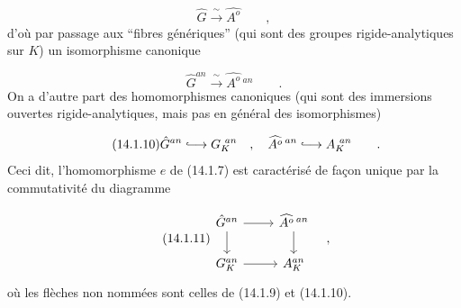 \begin{equation}\tag{14.1.8}
\hat{G} \xrightarrow{\ \sim\ } \widehat{A^{o}} \qquad ,
\end{equation}
d'où par passage aux ``fibres génériques'' (qui sont des groupes rigide-analytiques sur $K$) un isomorphisme canonique

\begin{equation}\tag{14.1.9}
\hat{G}^{an} \xrightarrow{\ \sim\ } \widehat{A^{o}}\,{}^{an} \qquad .
\end{equation}
On a d'autre part des homomorphismes canoniques (qui sont des immersions ouvertes rigide-analytiques, mais pas en général des isomorphismes)

\begin{equation}\tag{14.1.10}
\hat{G}^{an} \lhook\joinrel\longrightarrow G_K^{\ an} \quad , \quad \widehat{A^{o}}\,{}^{an} \lhook\joinrel\longrightarrow A_K^{\ an} \qquad .
\end{equation}
Ceci dit, l'homomorphisme $e$ de (14.1.7) est caractérisé de façon unique par la commutativité du diagramme

\begin{equation}\tag{14.1.11}
\begin{tikzcd}
\hat{G}^{an} \arrow[r] \arrow[d] & \widehat{A^{o}}\,{}^{an} \arrow[d] \\
G_K^{an} \arrow[r] & A_K^{an}
\end{tikzcd} \quad ,
\end{equation}
où les flèches non nommées sont celles de (14.1.9) et (14.1.10).


